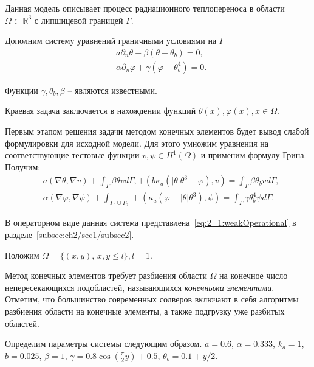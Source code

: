 Данная модель описывает процесс радиационного
теплопереноса в области $\Omega \subset \mathbb{R}^3$ с липшицевой границей $\Gamma$.

Дополним систему уравнений граничными условиями на $\Gamma$
\begin{equation*}
    \begin{aligned}
        & a \partial_n \theta + \beta (\theta - \theta_b) = 0, \\
        & \alpha \partial_n \varphi + \gamma(\varphi - \theta_b ^4 ) = 0.
    \end{aligned}
\end{equation*}


Функции $\gamma, \theta_b, \beta$ -- являются известными.

Краевая задача заключается в нахождении функций $\theta(x), \varphi(x), x \in \Omega$.

Первым этапом решения задачи методом конечных элементов будет вывод слабой формулировки для
исходной модели.
Для этого умножим уравнения на соответствующие тестовые функции
$v, \psi \in H^1(\Omega)$ и применим формулу Грина.
Получим:
\begin{equation*}
    \begin{aligned}
        & a( \nabla \theta, \nabla v ) + \int_\Gamma \beta \theta v d\Gamma,
        + (b \kappa_a (| \theta | \theta^3 - \varphi ), v)
        =  \int_\Gamma \beta \theta_b v d\Gamma,
        \\
        & \alpha (\nabla \varphi,\nabla \psi) + \int_{\Gamma_0 \cup \Gamma_2}
        + (\kappa_a (\varphi - |\theta|\theta^3), \psi)
        = \int_{\Gamma} \gamma \theta_b^4 \psi d\Gamma.
    \end{aligned}
\end{equation*}

В операторном виде данная система представлена~\eqref{eq:2_1:weakOperational}
в разделе~\ref{subsec:ch2/sec1/subsec2}.

Положим $\Omega=\{(x,y),\, x,y \leq l \}, l = 1$.

Метод конечных элементов требует разбиения области $\Omega$ на
конечное число непересекающихся подобластей, называющихся
\textit{конечными элементами}.
Отметим, что большинство современных солверов включают в себя
алгоритмы разбиения области на конечные элементы, а также подгрузку
уже разбитых областей.

Определим параметры системы следующим образом.
$a = 0.6$,
$\alpha = 0.333$,
$k_a = 1$,
$b = 0.025$,
$\beta = 1$,
$\gamma = 0.8 \cos\left(\frac{\pi}{2} y\right) + 0.5$,
$\theta_b = 0.1 + y / 2$.

